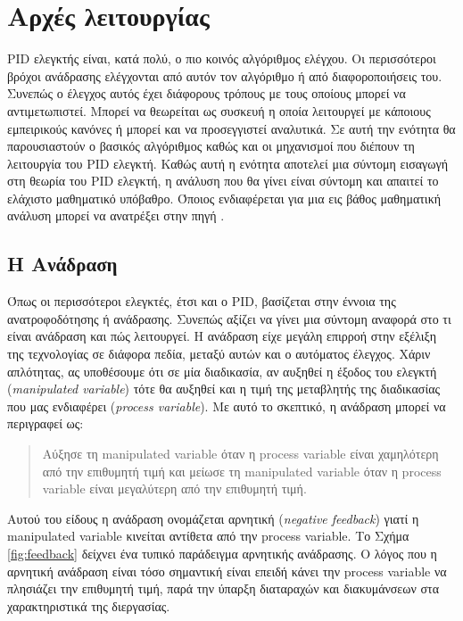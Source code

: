 \section{Αρχές λειτουργίας}

\lettrine[findent=2pt]{}{} PID ελεγκτής είναι, κατά πολύ, ο πιο κοινός αλγόριθμος ελέγχου. Οι περισσότεροι βρόχοι ανάδρασης ελέγχονται από αυτόν τον αλγόριθμο ή από διαφοροποιήσεις του. Συνεπώς ο έλεγχος αυτός έχει διάφορους τρόπους με τους οποίους μπορεί να αντιμετωπιστεί. Μπορεί να θεωρείται ως συσκευή η οποία λειτουργεί με κάποιους εμπειρικούς κανόνες ή μπορεί και να προσεγγιστεί αναλυτικά. Σε αυτή την ενότητα θα παρουσιαστούν ο βασικός αλγόριθμος καθώς και οι μηχανισμοί που διέπουν τη λειτουργία του PID ελεγκτή. Καθώς αυτή η ενότητα αποτελεί μια σύντομη εισαγωγή στη θεωρία του PID ελεγκτή, η ανάλυση που θα γίνει είναι σύντομη και απαιτεί το ελάχιστο μαθηματικό υπόβαθρο. Όποιος ενδιαφέρεται για μια εις βάθος μαθηματική ανάλυση μπορεί να ανατρέξει στην πηγή \cite{astrom}.

\subsection{H Ανάδραση}

Όπως οι περισσότεροι ελεγκτές, έτσι και ο PID, βασίζεται στην έννοια της ανατροφοδότησης ή ανάδρασης. Συνεπώς αξίζει να γίνει μια σύντομη αναφορά στο τι είναι ανάδραση και πώς λειτουργεί. Η ανάδραση είχε μεγάλη επιρροή στην εξέλιξη της τεχνολογίας σε διάφορα πεδία, μεταξύ αυτών και ο αυτόματος έλεγχος. Χάριν απλότητας, ας υποθέσουμε ότι σε μία διαδικασία, αν αυξηθεί η έξοδος του ελεγκτή (\emph{manipulated variable}) τότε θα αυξηθεί και η τιμή της μεταβλητής της διαδικασίας που μας ενδιαφέρει (\emph{process variable}). Με αυτό το σκεπτικό, η ανάδραση μπορεί να περιγραφεί ως:
\begin{quote}
Αύξησε τη manipulated variable όταν η process variable είναι χαμηλότερη από την επιθυμητή τιμή και μείωσε τη manipulated variable όταν η process variable είναι μεγαλύτερη από την επιθυμητή τιμή.
\end{quote}
Αυτού του είδους η ανάδραση ονομάζεται αρνητική (\emph{negative feedback}) γιατί η manipulated variable κινείται αντίθετα από την process variable. Το Σχήμα \ref{fig:feedback} δείχνει ένα τυπικό παράδειγμα αρνητικής ανάδρασης. Ο λόγος που η αρνητική ανάδραση είναι τόσο σημαντική είναι επειδή κάνει την process variable να πλησιάζει την επιθυμητή τιμή, παρά την ύπαρξη διαταραχών και διακυμάνσεων στα χαρακτηριστικά της διεργασίας.

